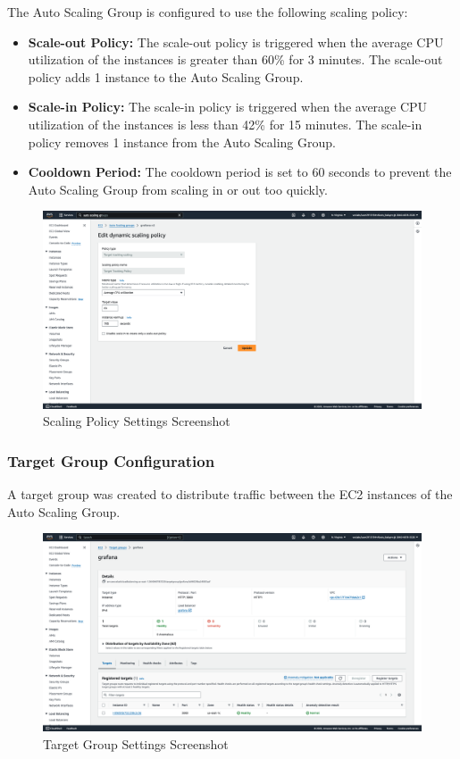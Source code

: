 \documentclass[12pt,oneside]{book} %
\begin{document}
The Auto Scaling Group is configured to use the following scaling policy:
\begin{itemize}
    \item \textbf{Scale-out Policy:} The scale-out policy is triggered when the average CPU utilization of the instances is greater than 60\% for 3 minutes. The scale-out policy adds 1 instance to the Auto Scaling Group.
    \item \textbf{Scale-in Policy:} The scale-in policy is triggered when the average CPU utilization of the instances is less than 42\% for 15 minutes. The scale-in policy removes 1 instance from the Auto Scaling Group.
    \item \textbf{Cooldown Period:} The cooldown period is set to 60 seconds to prevent the Auto Scaling Group from scaling in or out too quickly.
\end{itemize}

\begin{figure}[H]
    \centering
    \includegraphics[width=1\linewidth]{images/scaling-policy.png}
    \caption{Scaling Policy Settings Screenshot}
\end{figure}

\subsubsection{Target Group Configuration}

A target group was created to distribute traffic between the EC2 instances of
the Auto Scaling Group.

\begin{figure}[H]
    \centering
    \includegraphics[width=1\linewidth]{images/target-group.png}
    \caption{Target Group Settings Screenshot}
\end{figure}
\end{document}
